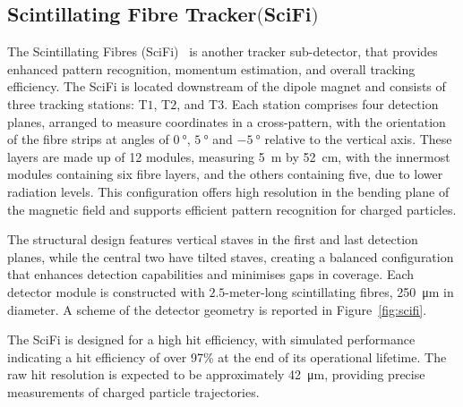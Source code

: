 \subsection[Scintillating Fibre Tracker]{Scintillating Fibre Tracker$ \bigl($SciFi$\bigr)$}
The Scintillating Fibres (SciFi)~\cite{scifi} is another tracker sub-detector, that provides enhanced pattern recognition, momentum estimation, and overall tracking efficiency.
The SciFi is located downstream of the dipole magnet and consists of three tracking stations: T$1$, T$2$, and T$3$. Each station comprises four detection planes, arranged to measure coordinates in a cross-pattern, with the orientation of the fibre strips at angles of $\SI{0}{\degree}$, $\SI{+5}{\degree}$ and $\SI{-5}{\degree}$ relative to the vertical axis. These layers are made up of 12 modules, measuring \SI{5}{\meter} by \SI{52}{\centi\meter}, with the innermost modules containing six fibre layers, and the others containing five, due to lower radiation levels. This configuration offers high resolution in the bending plane of the magnetic field and supports efficient pattern recognition for charged particles.

The structural design features vertical staves in the first and last detection planes, while the central two have tilted staves, creating a balanced configuration that enhances detection capabilities and minimises gaps in coverage. Each detector module is constructed with $2.5$-meter-long scintillating fibres, \SI{250}{\micro\meter} in diameter. 
A scheme of the detector geometry is reported in Figure~\ref{fig:scifi}.


The SciFi is designed for a high hit efficiency, with simulated performance indicating a hit efficiency of over 97\% at the end of its operational lifetime. The raw hit resolution is expected to be approximately \SI{42}{\micro\meter}, providing precise measurements of charged particle trajectories.

